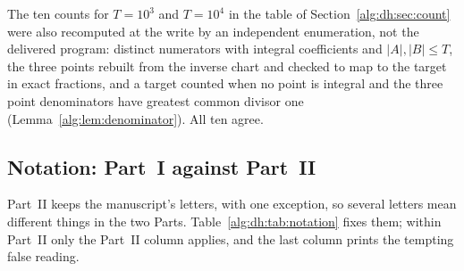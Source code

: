 \documentclass[11pt]{article}
\numberwithin{equation}{section}
\theoremstyle{plain}
\theoremstyle{plain}
\theoremstyle{plain}
\theoremstyle{definition}
\theoremstyle{definition}
\theoremstyle{definition}
\theoremstyle{remark}
\begin{document}
The ten counts for $T=10^3$ and $T=10^4$ in the table of
Section~\ref{alg:dh:sec:count} were also recomputed at the write by an
independent enumeration, not the delivered program: distinct numerators
with integral coefficients and $|A|,|B|\le T$, the three points rebuilt
from the inverse chart and checked to map to the target in exact
fractions, and a target counted when no point is integral and the three
point denominators have greatest common divisor one
(Lemma~\ref{alg:lem:denominator}). All ten agree.

\subsection{Notation: Part~I against Part~II}\label{alg:dh:sec:notation}
Part~II keeps the manuscript's letters, with one exception, so several
letters mean different things in the two Parts.
Table~\ref{alg:dh:tab:notation} fixes them; within Part~II only the
Part~II column applies, and the last column prints the tempting false
reading.
\end{document}
